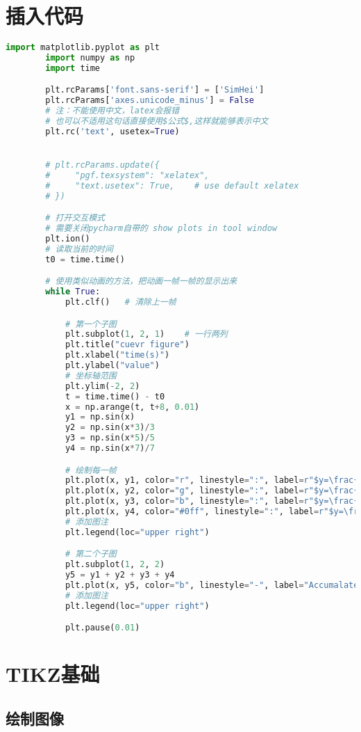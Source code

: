 \documentclass[cn, math=cm]{elegantbook}
\begin{document}
	\section{插入代码}
	\begin{lstlisting}[language=Python]
		import matplotlib.pyplot as plt
		import numpy as np
		import time

		plt.rcParams['font.sans-serif'] = ['SimHei']
		plt.rcParams['axes.unicode_minus'] = False
		# 注：不能使用中文，latex会报错
		# 也可以不适用这句话直接使用$公式$,这样就能够表示中文
		plt.rc('text', usetex=True)


		# plt.rcParams.update({
		#     "pgf.texsystem": "xelatex",
		#     "text.usetex": True,    # use default xelatex
		# })

		# 打开交互模式
		# 需要关闭pycharm自带的 show plots in tool window
		plt.ion()
		# 读取当前的时间
		t0 = time.time()

		# 使用类似动画的方法，把动画一帧一帧的显示出来
		while True:
		    plt.clf()   # 清除上一帧

		    # 第一个子图
		    plt.subplot(1, 2, 1)    # 一行两列
		    plt.title("cuevr figure")
		    plt.xlabel("time(s)")
		    plt.ylabel("value")
		    # 坐标轴范围
		    plt.ylim(-2, 2)
		    t = time.time() - t0
		    x = np.arange(t, t+8, 0.01)
		    y1 = np.sin(x)
		    y2 = np.sin(x*3)/3
		    y3 = np.sin(x*5)/5
		    y4 = np.sin(x*7)/7

		    # 绘制每一帧
		    plt.plot(x, y1, color="r", linestyle=":", label=r"$y=\frac{\sin(x)}{1}$")
		    plt.plot(x, y2, color="g", linestyle=":", label=r"$y=\frac{\sin(2x)}{2}$")
		    plt.plot(x, y3, color="b", linestyle=":", label=r"$y=\frac{\sin(3x)}{3}$")
		    plt.plot(x, y4, color="#0ff", linestyle=":", label=r"$y=\frac{\sin(4x)}{4}$")
		    # 添加图注
		    plt.legend(loc="upper right")

		    # 第二个子图
		    plt.subplot(1, 2, 2)
		    y5 = y1 + y2 + y3 + y4
		    plt.plot(x, y5, color="b", linestyle="-", label="Accumalate")
		    # 添加图注
		    plt.legend(loc="upper right")

		    plt.pause(0.01)
	\end{lstlisting}

	\section{TIKZ基础}
	\subsection{绘制图像}
\end{document}
